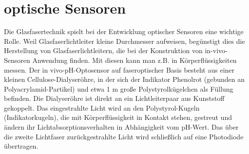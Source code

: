 \section{optische Sensoren}
Die Glasfasertechnik spielt bei der Entwicklung optischer Sensoren eine wichtige Rolle. Weil Glasfaserlichtleiter kleine Durchmesser aufweisen, begünstigt dies die Herstellung von Glasfaserlichtleitern, die bei der Konstruktion von in-vivo-Sensoren Anwendung finden. Mit diesen kann man z.B. in Körperflüssigkeiten messen. Der in vivo-pH-Optosensor auf faseroptischer Basis besteht aus einer kleinen Cellulose-Dialyseröhre, in der sich der Indikator Phenolrot (gebunden an Polyacrylamid-Partikel) und etwa 1 \textmu m große Polystyrolkügelchen als Füllung befinden. Die Dialyseröhre ist direkt an ein Lichtleiterpaar aus Kunststoff gekoppelt. Das eingestrahlte Licht wird an den Polystyrol-Kugeln (Indikatorkugeln), die mit Körperflüssigkeit in Kontakt stehen, gestreut und ändern ihr Lichtabsorptionsverhalten in Abhängigkeit vom pH-Wert. Das über die zweite Lichtfaser zurückgestrahlte Licht wird schließlich auf eine Photodiode übertragen. \cite{[5]}

